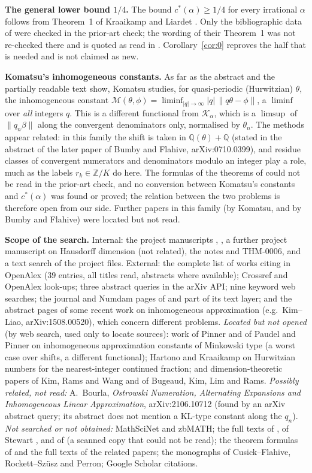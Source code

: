 \documentclass[11pt]{amsart}
\theoremstyle{definition}
\theoremstyle{remark}
\newcommand{\Z}{\mathbb{Z}}
\newcommand{\Q}{\mathbb{Q}}
\newcommand{\dist}[1]{\lVert #1\rVert}
\newcommand{\KL}{\mathcal{K}}
\begin{document}
\medskip\noindent\textbf{The general lower bound $1/4$.} The bound $c^*(\alpha)\ge1/4$ for every irrational
$\alpha$ follows from Theorem~1 of Kraaikamp and Liardet \cite{KL}. Only the bibliographic data of \cite{KL} were
checked in the prior-art check; the wording of their Theorem~1 was not re-checked there and is quoted as read
in \cite{D5}. Corollary~\ref{cor:0} reproves the half that is needed and is not claimed as new.

\medskip\noindent\textbf{Komatsu's inhomogeneous constants.} As far as the abstract and the partially readable text show, Komatsu
\cite{Komatsu99} studies, for quasi-periodic (Hurwitzian) $\theta$, the inhomogeneous constant $\mathcal M(\theta,\phi)=\liminf_{|q|\to\infty}|q|\,\dist{q\theta-\phi}$, a
$\liminf$ over \emph{all} integers $q$. This is a different functional from $\KL_\alpha$, which is a $\limsup$ of
$\dist{q_n\beta}$ along the convergent denominators only, normalised by $\theta_n$. The methods appear related: in this
family the shift is taken in $\Q(\theta)+\Q$ (stated in the abstract of the later paper of Bumby and Flahive,
arXiv:0710.0399), and residue classes of convergent numerators and denominators modulo an integer play a role,
much as the labels $r_k\in\Z/K$ do here. The formulas of the theorems of \cite{Komatsu99} could not be read in the
prior-art check, and no conversion between Komatsu's constants and $c^*(\alpha)$ was found or proved; the
relation between the two problems is therefore open from our side. Further papers in this family (by Komatsu,
and by Bumby and Flahive) were located but not read.

\medskip\noindent\textbf{Scope of the search.} Internal: the project manuscripts \cite{P2}, \cite{P2E}, a further
project manuscript on Hausdorff dimension (not related), the notes \cite{D5} and THM-0006, and a text search
of the project files. External: the complete list of works citing \cite{KL} in OpenAlex ($39$ entries, all titles
read, abstracts where available); Crossref and OpenAlex look-ups; three abstract queries in the arXiv API; nine
keyword web searches; the journal and Numdam pages of \cite{Komatsu99} and part of its text layer; and the
abstract pages of some recent work on inhomogeneous approximation (e.g.\ Kim--Liao, arXiv:1508.00520), which
concern different problems. \emph{Located but not opened} (by web search, used only to locate sources): work of Pinner and of Paudel and
Pinner on inhomogeneous approximation constants of Minkowski type (a worst case over shifts, a different
functional); Hartono and Kraaikamp on Hurwitzian numbers for the nearest-integer continued fraction; and
dimension-theoretic papers of Kim, Rams and Wang and of Bugeaud, Kim, Lim and Rams. \emph{Possibly related,
not read:} A.~Bourla, \emph{Ostrowski Numeration, Alternating Expansions and Inhomogeneous Linear Approximation},
arXiv:2106.10712 (found by an arXiv abstract query; its abstract does not mention a KL-type constant along the
$q_n$). \emph{Not searched or not obtained:} MathSciNet and zbMATH; the full texts of \cite{KL},
of Stewart \cite{Stewart}, and of \cite{BDS} (a scanned copy that could not be read); the theorem formulas of
\cite{Komatsu99} and the full texts of the related papers; the monographs of Cusick--Flahive, Rockett--Sz\"usz and
Perron; Google Scholar citations.
\end{document}
